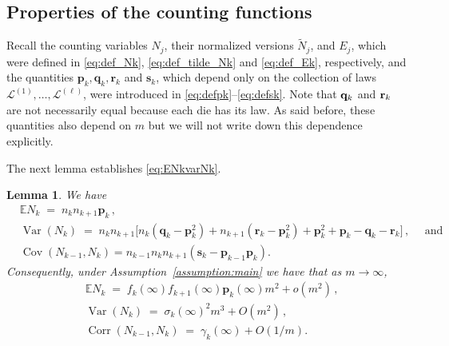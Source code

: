 \documentclass[reqno,a4paper,11pt]{amsart}
\newtheorem{lemma}{Lemma}
\theoremstyle{remark}
\newcommand{\mc}[1]{{\mathcal #1}}
\newcommand{\mb}[1]{{\mathbf #1}}
\newcommand{\bb}[1]{{\mathbb #1}}
\numberwithin{equation}{section}
\newcommand{\var}[1]{\operatorname{Var}\left(#1\right)}
\newcommand{\cov}[1]{\operatorname{Cov}\left(#1\right)}
\newcommand{\corr}[1]{\operatorname{Corr}\left(#1\right)}
\begin{document}
\subsection{Properties of the counting functions}\hfill 

Recall the counting variables $N_j$, their normalized versions $\widetilde N_j$, and $E_j$, which were defined in \eqref{eq:def_Nk}, \eqref{eq:def_tilde_Nk} and \eqref{eq:def_Ek}, respectively, and the quantities $\mb p_k,\mb q_k,\mb r_k$ and $\mb s_k$, which depend only on the collection of laws $\mc L^{(1)},\ldots, \mc L^{(\ell)}$, were introduced in \eqref{eq:defpk}--\eqref{eq:defsk}. Note that ${\bf q}_k$ and ${\bf r}_k$ are not necessarily equal because each die has its law. As said before, these quantities also depend on $m$ but we will not write down this dependence explicitly.

The next lemma establishes \eqref{eq:ENkvarNk}.

\begin{lemma}
\label{lema:mean_var_Nk}
We have
\begin{align*}
&\bb E N_k \;=\; n_k n_{k+1} \mb p_k\, , \\
&\var{N_k}
    \;=\; n_k n_{k+1}
    \bigl[n_k(\mb q_k - \mb p_k^2) + n_{k+1}(\mb r_k - \mb p_k^2)
    + \mb p_k^2 + \mb p_k -  \mb q_k -  \mb r_k
    \bigr]\, ,  \quad \text{ and} \\
& \cov{N_{k-1},N_k}=n_{k-1}n_kn_{k+1}\left(\mb s_k-\mb p_{k-1}\mb p_k\right).
\end{align*}
Consequently, under Assumption~\ref{assumption:main} we have that as $m\to \infty$,
\begin{align*}
&\bb E N_k  \;=\; f_k(\infty) f_{k+1}(\infty) \mb p_k(\infty)m^2 +o(m^2)\,,\\
 &\var{N_k} \;=\; \sigma_k(\infty)^2 m^3 +
    O(m^2)\, ,\\
 & \corr{N_{k-1},N_{k}}\;=\; \gamma_k(\infty) +O(1/m).
\end{align*}
\end{lemma}
\end{document}
